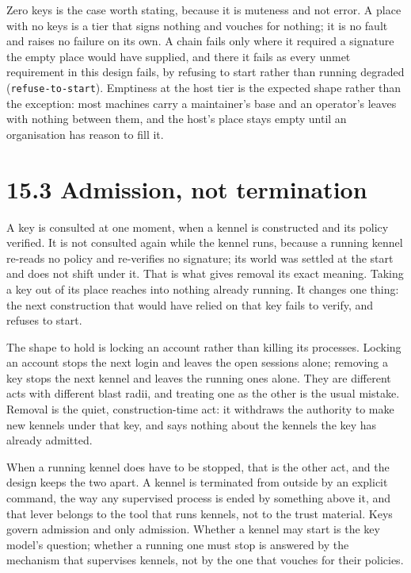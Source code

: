 Zero keys is the case worth stating, because it is muteness and not
error. A place with no keys is a tier that signs nothing and vouches for
nothing; it is no fault and raises no failure on its own. A chain fails
only where it required a signature the empty place would have supplied,
and there it fails as every unmet requirement in this design fails, by
refusing to start rather than running degraded
(\texttt{refuse-to-start}). Emptiness at the host tier is the expected
shape rather than the exception: most machines carry a maintainer's base
and an operator's leaves with nothing between them, and the host's place
stays empty until an organisation has reason to fill it.

\hypertarget{admission-not-termination}{%
\section{15.3 Admission, not
termination}\label{admission-not-termination}}

A key is consulted at one moment, when a kennel is constructed and its
policy verified. It is not consulted again while the kennel runs,
because a running kennel re-reads no policy and re-verifies no
signature; its world was settled at the start and does not shift under
it. That is what gives removal its exact meaning. Taking a key out of
its place reaches into nothing already running. It changes one thing:
the next construction that would have relied on that key fails to
verify, and refuses to start.

The shape to hold is locking an account rather than killing its
processes. Locking an account stops the next login and leaves the open
sessions alone; removing a key stops the next kennel and leaves the
running ones alone. They are different acts with different blast radii,
and treating one as the other is the usual mistake. Removal is the
quiet, construction-time act: it withdraws the authority to make new
kennels under that key, and says nothing about the kennels the key has
already admitted.

When a running kennel does have to be stopped, that is the other act,
and the design keeps the two apart. A kennel is terminated from outside
by an explicit command, the way any supervised process is ended by
something above it, and that lever belongs to the tool that runs
kennels, not to the trust material. Keys govern admission and only
admission. Whether a kennel may start is the key model's question;
whether a running one must stop is answered by the mechanism that
supervises kennels, not by the one that vouches for their policies.

